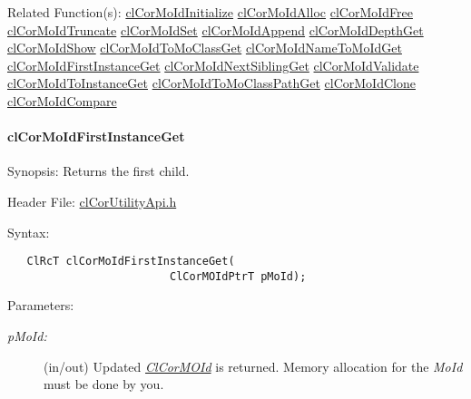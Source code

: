 \begin{Desc}
\item[Related Function(s):]\hyperlink{group__group13}{cl\-Cor\-Mo\-Id\-Initialize} \hyperlink{group__group13}{cl\-Cor\-Mo\-Id\-Alloc} \hyperlink{group__group13}{cl\-Cor\-Mo\-Id\-Free} \hyperlink{group__group13}{cl\-Cor\-Mo\-Id\-Truncate} \hyperlink{group__group13}{cl\-Cor\-Mo\-Id\-Set} \hyperlink{group__group13}{cl\-Cor\-Mo\-Id\-Append} \hyperlink{group__group13}{cl\-Cor\-Mo\-Id\-Depth\-Get} \hyperlink{group__group13}{cl\-Cor\-Mo\-Id\-Show} \hyperlink{group__group13}{cl\-Cor\-Mo\-Id\-To\-Mo\-Class\-Get} \hyperlink{group__group13}{cl\-Cor\-Mo\-Id\-Name\-To\-Mo\-Id\-Get} \hyperlink{group__group13}{cl\-Cor\-Mo\-Id\-First\-Instance\-Get} \hyperlink{group__group13}{cl\-Cor\-Mo\-Id\-Next\-Sibling\-Get} \hyperlink{group__group13}{cl\-Cor\-Mo\-Id\-Validate} \hyperlink{group__group13}{cl\-Cor\-Mo\-Id\-To\-Instance\-Get} \hyperlink{group__group13}{cl\-Cor\-Mo\-Id\-To\-Mo\-Class\-Path\-Get} \hyperlink{group__group13}{cl\-Cor\-Mo\-Id\-Clone} \hyperlink{group__group13}{cl\-Cor\-Mo\-Id\-Compare} \end{Desc}
\hypertarget{pagecor238}{}\paragraph{cl\-Cor\-Mo\-Id\-First\-Instance\-Get}\label{pagecor238}
\begin{Desc}
\item[Synopsis:]Returns the first child.\end{Desc}
\begin{Desc}
\item[Header File:]\hyperlink{cl_cor_utility_api_8h}{cl\-Cor\-Utility\-Api.h}\end{Desc}
\begin{Desc}
\item[Syntax:]

\footnotesize\begin{verbatim}   ClRcT clCorMoIdFirstInstanceGet(
                         ClCorMOIdPtrT pMoId);  
\end{verbatim}
\normalsize
\end{Desc}
\begin{Desc}
\item[Parameters:]
\begin{description}
\item[{\em p\-Mo\-Id:}](in/out) Updated {\em \hyperlink{struct_cl_cor_m_o_id}{Cl\-Cor\-MOId}\/} is returned. Memory allocation for the {\em Mo\-Id\/} must be done by you.\end{description}
\end{Desc}
